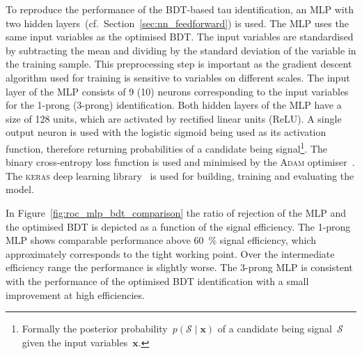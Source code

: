 To reproduce the performance of the BDT-based tau identification, an MLP with
two hidden layers~(cf.\ Section~\ref{sec:nn_feedforward}) is used. The MLP uses
the same input variables as the optimised BDT. The input variables are
standardised by subtracting the mean and dividing by the standard deviation of
the variable in the training sample. This preprocessing step is important as the
gradient descent algorithm used for training is sensitive to variables on
different scales. The input layer of the MLP consists of 9 (10) neurons
corresponding to the input variables for the 1-prong (3-prong) identification.
Both hidden layers of the MLP have a size of 128 units, which are activated by
rectified linear units (ReLU). A single output neuron is used with the logistic
sigmoid being used as its activation function, therefore returning probabilities
of a \tauhadvis candidate being signal\footnote{Formally the posterior
  probability~$p(\mathcal{S} \mid \mathbf{x})$ of a candidate being
  signal~$\mathcal{S}$ given the input variables~$\mathbf{x}$.}. The binary
cross-entropy loss function is used and minimised by the \textsc{Adam}
optimiser~\cite{adam}. The \textsc{keras} deep learning library~\cite{keras} is
used for building, training and evaluating the model.

In Figure~\ref{fig:roc_mlp_bdt_comparison} the ratio of rejection of the MLP and
the optimised BDT is depicted as a function of the signal efficiency. The
1-prong MLP shows comparable performance above \SI{60}{\percent} signal
efficiency, which approximately corresponds to the tight working point. Over the
intermediate efficiency range the performance is slightly worse. The 3-prong MLP
is consistent with the performance of the optimised BDT identification with a
small improvement at high efficiencies.

